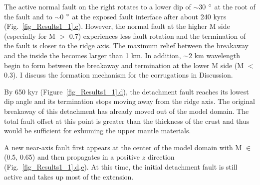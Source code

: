 The active normal fault on the right rotates to a lower dip of $\sim$30 $\degree$ at the root of the fault and to $\sim$0 $\degree$ at the exposed fault interface after about 240 kyrs (Fig.~\hyperref[fig_Results1_1]{\ref{fig_Results1_1}.c}). However, the normal fault at the higher M side (especially for M $>$ 0.7) experiences less fault rotation and the termination of the fault is closer to the ridge axis. The maximum relief between the breakaway and the  inside the  becomes larger than 1 km. In addition, $\sim$2 km wavelength  begin to form between the breakaway and termination at the lower M side (M $<$ 0.3). I discuss the formation mechanism for the corrugations in Discussion.
%

By 650 kyr (Figure~\hyperref[fig_Results1_1]{\ref{fig_Results1_1}.d}), the detachment fault reaches its lowest dip angle and its termination stops moving away from the ridge axis. The original breakaway of this detachment has already moved out of the model domain.
The total fault offset at this point is greater than the thickness of the crust and thus would be sufficient for exhuming the upper mantle materials. %

A new near-axis fault first appears at the center of the model domain with M $\in$ (0.5, 0.65) and then propagates in a positive $z$ direction (Fig.~\hyperref[fig_Results1_1]{\ref{fig_Results1_1}.d,e}). At this time, the initial detachment fault is still active and takes up most of the extension. %

